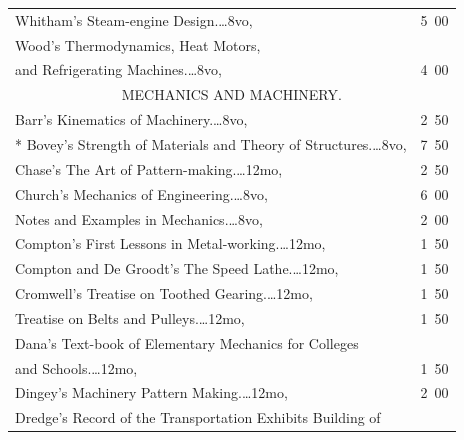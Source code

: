 \documentclass[a4paper,12pt]{book}[2004/02/16]
\theoremstyle{ilemma}
\theoremstyle{itheorem}
\theoremstyle{iother}
\theoremstyle{icorollary}
\theoremstyle{numcorollary}
\theoremstyle{idefinition}
\begin{document}
\begin{longtable}{@{}l@{ }r@{}}
Whitham's Steam-engine Design.\dotfill\ldots 8vo, &5\ 00\\

Wood's Thermodynamics, Heat Motors,\\

\nopagebreak

\indent\indent and Refrigerating Machines.\dotfill\ldots 8vo, &4\ 00\\[3em]



\multicolumn{2}{c}{\large MECHANICS AND MACHINERY.}\\[1em]

\nopagebreak

Barr's Kinematics of Machinery.\dotfill\ldots 8vo, &2\ 50\\

* Bovey's Strength of Materials and Theory of
  Structures.\dotfill\ldots 8vo, &7\ 50\\

Chase's The Art of Pattern-making.\dotfill\ldots 12mo, &2\ 50\\

Church's Mechanics of Engineering.\dotfill\ldots 8vo, &6\ 00\\

\indent Notes and Examples in Mechanics.\dotfill\ldots 8vo, &2\ 00\\

Compton's First Lessons in Metal-working.\dotfill\ldots 12mo, &1\ 50\\

Compton and De Groodt's The Speed Lathe.\dotfill\ldots 12mo, &1\ 50\\

Cromwell's Treatise on Toothed Gearing.\dotfill\ldots 12mo, &1\ 50\\

\indent Treatise on Belts and Pulleys.\dotfill\ldots 12mo, &1\ 50\\

Dana's Text-book of Elementary Mechanics for Colleges\\

\nopagebreak

\indent\indent and Schools.\dotfill\ldots 12mo, & 1\ 50\\

Dingey's Machinery Pattern Making.\dotfill\ldots 12mo, &2\ 00\\

Dredge's Record of the Transportation Exhibits Building of\\


\end{longtable}
\end{document}
